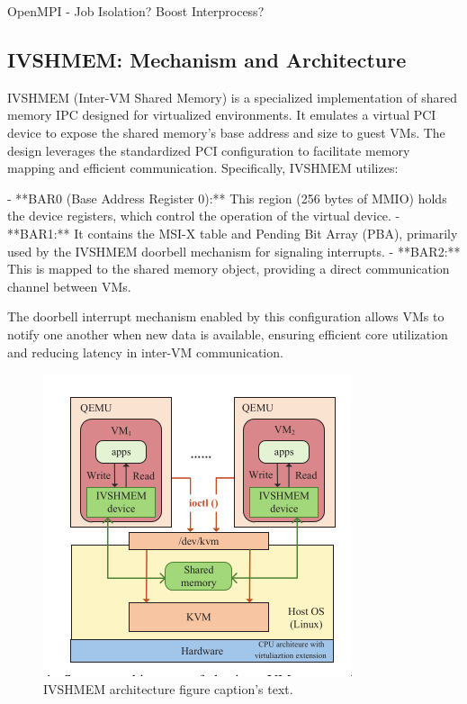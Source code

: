 \documentclass[conference]{IEEEtran}
\begin{document}
OpenMPI - Job Isolation?
Boost Interprocess?

\subsection{IVSHMEM: Mechanism and Architecture}


IVSHMEM (Inter-VM Shared Memory) is a specialized implementation of shared memory IPC designed for virtualized environments. It emulates a virtual PCI device to expose the shared memory's base address and size to guest VMs. The design leverages the standardized PCI configuration to facilitate memory mapping and efficient communication. Specifically, IVSHMEM utilizes:

- **BAR0 (Base Address Register 0):** This region (256 bytes of MMIO) holds the device registers, which control the operation of the virtual device.
- **BAR1:** It contains the MSI-X table and Pending Bit Array (PBA), primarily used by the IVSHMEM doorbell mechanism for signaling interrupts.
- **BAR2:** This is mapped to the shared memory object, providing a direct communication channel between VMs.

The doorbell interrupt mechanism enabled by this configuration allows VMs to notify one another when new data is available, ensuring efficient core utilization and reducing latency in inter-VM communication.

\begin{figure}[ht]
\begin{center}
  \includegraphics[width=0.95\linewidth]{./figures/ivshmem_arch.png}
\end{center}
\caption{\label{fig:ivshmem_arch} IVSHMEM architecture figure 
  caption's text. }
\end{figure}
\end{document}
